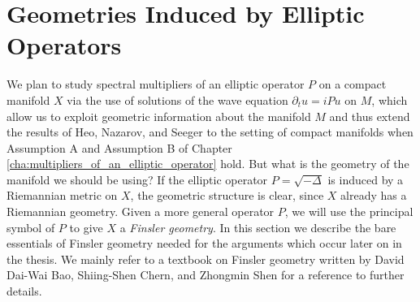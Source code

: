 
\section{Geometries Induced by Elliptic Operators} \label{sec:geometriesinduced}

We plan to study spectral multipliers of an elliptic operator $P$ on a compact manifold $X$ via the use of solutions of the wave equation $\partial_t u = i P u$ on $M$, which allow us to exploit geometric information about the manifold $M$ and thus extend the results of Heo, Nazarov, and Seeger to the setting of compact manifolds when Assumption A and Assumption B of Chapter \ref{cha:multipliers_of_an_elliptic_operator} hold. But what is the geometry of the manifold we should be using? If the elliptic operator $P = \sqrt{-\Delta}$ is induced by a Riemannian metric on $X$, the geometric structure is clear, since $X$ already has a Riemannian geometry. Given a more general operator $P$, we will use the principal symbol of $P$ to give $X$ a \emph{Finsler geometry}. In this section we describe the bare essentials of Finsler geometry needed for the arguments which occur later on in the thesis. We mainly refer to a textbook on Finsler geometry written by David Dai-Wai Bao, Shiing-Shen Chern, and Zhongmin Shen \cite{BaoChern} for a reference to further details.

